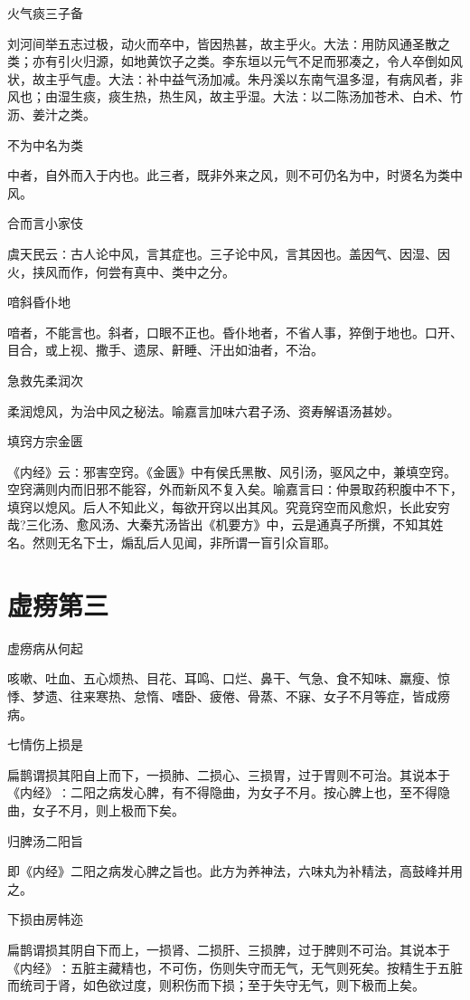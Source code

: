 \documentclass[a4paper,12pt,UTF8,twoside]{ctexbook}
\begin{document}
	火气痰三子备
	
	刘河间举五志过极，动火而卒中，皆因热甚，故主乎火。大法∶用防风通圣散之类；亦有引火归源，如地黄饮子之类。李东垣以元气不足而邪凑之，令人卒倒如风状，故主乎气虚。大法∶补中益气汤加减。朱丹溪以东南气温多湿，有病风者，非风也；由湿生痰，痰生热，热生风，故主乎湿。大法∶以二陈汤加苍术、白术、竹沥、姜汁之类。
	
	不为中名为类
	
	中者，自外而入于内也。此三者，既非外来之风，则不可仍名为中，时贤名为类中风。
	
	合而言小家伎
	
	虞天民云∶古人论中风，言其症也。三子论中风，言其因也。盖因气、因湿、因火，挟风而作，何尝有真中、类中之分。
	
	喑斜昏仆地
	
	喑者，不能言也。斜者，口眼不正也。昏仆地者，不省人事，猝倒于地也。口开、目合，或上视、撒手、遗尿、鼾睡、汗出如油者，不治。
	
	急救先柔润次
	
	柔润熄风，为治中风之秘法。喻嘉言加味六君子汤、资寿解语汤甚妙。
	
	填窍方宗金匮
	
	《内经》云∶邪害空窍。《金匮》中有侯氏黑散、风引汤，驱风之中，兼填空窍。空窍满则内而旧邪不能容，外而新风不复入矣。喻嘉言曰∶仲景取药积腹中不下，填窍以熄风。后人不知此义，每欲开窍以出其风。究竟窍空而风愈炽，长此安穷哉?三化汤、愈风汤、大秦艽汤皆出《机要方》中，云是通真子所撰，不知其姓名。然则无名下士，煽乱后人见闻，非所谓一盲引众盲耶。
	
	\chapter{虚痨第三}
	虚痨病从何起
	
	咳嗽、吐血、五心烦热、目花、耳鸣、口烂、鼻干、气急、食不知味、羸瘦、惊悸、梦遗、往来寒热、怠惰、嗜卧、疲倦、骨蒸、不寐、女子不月等症，皆成痨病。
	
	七情伤上损是
	
	扁鹊谓损其阳自上而下，一损肺、二损心、三损胃，过于胃则不可治。其说本于《内经》∶二阳之病发心脾，有不得隐曲，为女子不月。按心脾上也，至不得隐曲，女子不月，则上极而下矣。
	
	归脾汤二阳旨
	
	即《内经》二阳之病发心脾之旨也。此方为养神法，六味丸为补精法，高鼓峰并用之。
	
	下损由房帏迩
	
	扁鹊谓损其阴自下而上，一损肾、二损肝、三损脾，过于脾则不可治。其说本于《内经》∶五脏主藏精也，不可伤，伤则失守而无气，无气则死矣。按精生于五脏而统司于肾，如色欲过度，则积伤而下损；至于失守无气，则下极而上矣。
	
\end{document}
